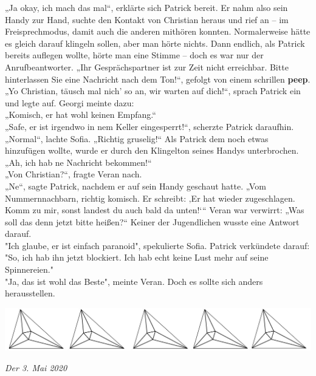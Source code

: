 \documentclass[oneside]{memoir}
\newcommand{\parasep}{
\bigskip
\bigskip
\begin{center} 
   \includegraphics[scale=.08]{parasep5.jpg} 
\end{center}
\bigskip
\bigskip
}
\begin{document}
„Ja okay, ich mach das mal“, erklärte sich Patrick bereit. Er nahm also sein Handy zur Hand, suchte den Kontakt von Christian heraus und rief an -- im Freisprechmodus, damit auch die anderen mithören konnten.
Normalerweise hätte es gleich darauf klingeln sollen, aber man hörte nichts. Dann endlich, als Patrick bereits auflegen wollte, hörte man eine Stimme -- doch es war nur der 
Anrufbeantworter. „Ihr Gesprächspartner ist zur Zeit nicht erreichbar. Bitte hinterlassen Sie eine Nachricht nach dem Ton!“, gefolgt von einem schrillen \textbf{peep}. \\
„Yo Christian, täusch mal nich' so an, wir warten auf dich!“, sprach Patrick ein und legte auf.
Georgi meinte dazu:  \\ „Komisch, er hat wohl keinen Empfang.“ \\
„Safe, er ist irgendwo in nem Keller eingesperrt!“, scherzte Patrick daraufhin. \\
„Normal“, lachte Sofia. „Richtig gruselig!“
Als Patrick dem noch etwas hinzufügen wollte, wurde er durch den Klingelton seines Handys unterbrochen. \\ „Ah, ich hab ne Nachricht bekommen!“ \\
„Von Christian?“, fragte Veran nach. \\
„Ne“, sagte Patrick, nachdem er auf sein Handy geschaut hatte. „Vom Nummernnachbarn, richtig komisch. Er schreibt: ‚Er hat wieder zugeschlagen. Komm zu mir, sonst landest du auch bald da unten!‘“
Veran war verwirrt: „Was soll das denn jetzt bitte heißen?“
Keiner der Jugendlichen wusste eine Antwort darauf. \\
"Ich glaube, er ist einfach paranoid", spekulierte Sofia.
Patrick verkündete darauf: "So, ich hab ihn jetzt blockiert. Ich hab echt keine Lust mehr auf seine Spinnereien." \\
"Ja, das ist wohl das Beste", meinte Veran. Doch es sollte sich anders herausstellen.
 
     
\parasep
     \textit{Der 3. Mai 2020} \\
     
\end{document}
